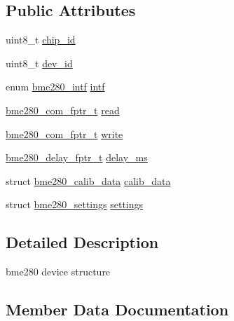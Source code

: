 \subsection*{Public Attributes}
\begin{DoxyCompactItemize}
\item 
uint8\+\_\+t \hyperlink{structbme280__dev_a6147bb3590bc7d1b02c41454d13c81c0}{chip\+\_\+id}
\item 
uint8\+\_\+t \hyperlink{structbme280__dev_a1f75cc7ecf84476a440ded0cd8c2fba7}{dev\+\_\+id}
\item 
enum \hyperlink{group___b_m_e280_ga142fcd9cb1e99b793488e9b3b1e6766e}{bme280\+\_\+intf} \hyperlink{structbme280__dev_a937b25397d1455117b64b1380368d30c}{intf}
\item 
\hyperlink{group___b_m_e280_ga7c23fe68ccf92adb3f03882b40739e7b}{bme280\+\_\+com\+\_\+fptr\+\_\+t} \hyperlink{structbme280__dev_a9a0ad5b467e2acc04a854878fe71bf7f}{read}
\item 
\hyperlink{group___b_m_e280_ga7c23fe68ccf92adb3f03882b40739e7b}{bme280\+\_\+com\+\_\+fptr\+\_\+t} \hyperlink{structbme280__dev_a7d2437824573644b51b8514ca0ec294c}{write}
\item 
\hyperlink{group___b_m_e280_gab2783d9a00e56ddc3e0e8d37b3462e34}{bme280\+\_\+delay\+\_\+fptr\+\_\+t} \hyperlink{structbme280__dev_a8f8957a3f4438239bd79b075691f0fd1}{delay\+\_\+ms}
\item 
struct \hyperlink{structbme280__calib__data}{bme280\+\_\+calib\+\_\+data} \hyperlink{structbme280__dev_a8a57e57db020663dc3a8f3438cd6b399}{calib\+\_\+data}
\item 
struct \hyperlink{structbme280__settings}{bme280\+\_\+settings} \hyperlink{structbme280__dev_acd3efe8b8ac1e08f9cb21e8abec27042}{settings}
\end{DoxyCompactItemize}


\subsection{Detailed Description}
bme280 device structure 

\subsection{Member Data Documentation}
\mbox{\label{structbme280__dev_a8a57e57db020663dc3a8f3438cd6b399}} 
